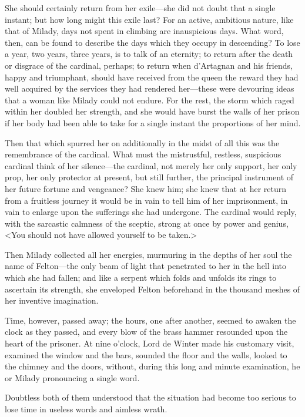She should certainly return from her exile---she did not doubt that a single instant; but how long might this exile last? For an active, ambitious nature, like that of Milady, days not spent in climbing are inauspicious days. What word, then, can be found to describe the days which they occupy in descending? To lose a year, two years, three years, is to talk of an eternity; to return after the death or disgrace of the cardinal, perhaps; to return when d'Artagnan and his friends, happy and triumphant, should have received from the queen the reward they had well acquired by the services they had rendered her---these were devouring ideas that a woman like Milady could not endure. For the rest, the storm which raged within her doubled her strength, and she would have burst the walls of her prison if her body had been able to take for a single instant the proportions of her mind. 

Then that which spurred her on additionally in the midst of all this was the remembrance of the cardinal. What must the mistrustful, restless, suspicious cardinal think of her silence---the cardinal, not merely her only support, her only prop, her only protector at present, but still further, the principal instrument of her future fortune and vengeance? She knew him; she knew that at her return from a fruitless journey it would be in vain to tell him of her imprisonment, in vain to enlarge upon the sufferings she had undergone. The cardinal would reply, with the sarcastic calmness of the sceptic, strong at once by power and genius, <You should not have allowed yourself to be taken.> 

Then Milady collected all her energies, murmuring in the depths of her soul the name of Felton---the only beam of light that penetrated to her in the hell into which she had fallen; and like a serpent which folds and unfolds its rings to ascertain its strength, she enveloped Felton beforehand in the thousand meshes of her inventive imagination. 

Time, however, passed away; the hours, one after another, seemed to awaken the clock as they passed, and every blow of the brass hammer resounded upon the heart of the prisoner. At nine o'clock, Lord de Winter made his customary visit, examined the window and the bars, sounded the floor and the walls, looked to the chimney and the doors, without, during this long and minute examination, he or Milady pronouncing a single word. 

Doubtless both of them understood that the situation had become too serious to lose time in useless words and aimless wrath. 

